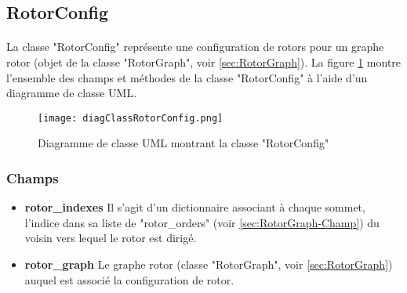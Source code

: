 \documentclass{article}
\begin{document}
	\subsection{RotorConfig}
	\paragraph*{}
	La classe "RotorConfig" représente une configuration de rotors pour un graphe rotor (objet de la classe "RotorGraph", voir \ref{sec:RotorGraph}). La figure \ref{fig:diagClassRotorConfig} montre l'ensemble des champs et méthodes de la classe "RotorConfig" à l'aide d'un diagramme de classe UML.
	
	\begin{figure}[h]
		\texttt{[image: diagClassRotorConfig.png]}
		\centering
		\caption{Diagramme de classe UML montrant la classe "RotorConfig"}
		\label{fig:diagClassRotorConfig}
	\end{figure}
	
	\subsubsection{Champs}
	\begin{itemize}	
		\item \textbf{rotor\_indexes}\newline
		Il s'agit d'un dictionnaire associant à chaque sommet, l'indice dans sa liste de "rotor\_orders" (voir \ref{sec:RotorGraph-Champ}) du voisin vers lequel le rotor est dirigé.
		\item \textbf{rotor\_graph}\newline
		Le graphe rotor (classe "RotorGraph", voir \ref{sec:RotorGraph}) auquel est associé la configuration de rotor.
	\end{itemize}
	
\end{document}
